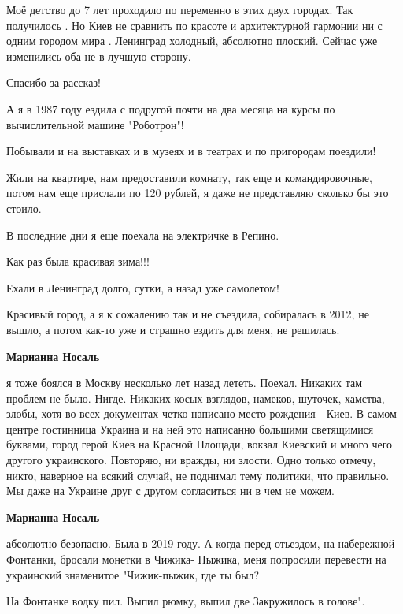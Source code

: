 \begin{itemize}
\begin{itemize}
\end{itemize} %


Моё детство до 7 лет проходило по переменно в этих двух городах. Так получилось .
Но Киев не сравнить по красоте и архитектурной гармонии ни с одним городом мира .
Ленинград холодный, абсолютно плоский.
Сейчас уже изменились оба не в лучшую сторону.

Спасибо за рассказ!

А я в 1987 году ездила с подругой почти на два месяца на курсы по
вычислительной машине "Роботрон"!

Побывали и на выставках и в музеях и в театрах и по пригородам поездили!

Жили на квартире, нам предоставили комнату, так еще и командировочные, потом
нам еще прислали по 120 рублей, я даже не представляю сколько бы это стоило.

В последние дни я еще поехала на электричке в Репино.

Как раз была красивая зима!!!

Ехали в Ленинград долго, сутки, а назад уже самолетом!


Красивый город, а я к сожалению так и не съездила, собиралась в 2012, не вышло,
а потом как-то уже и страшно ездить для меня, не решилась.

\begin{itemize} %
\textbf{Марианна Носаль} 

я тоже боялся в Москву несколько лет назад лететь. Поехал. Никаких там проблем
не было. Нигде. Никаких косых взглядов, намеков, шуточек, хамства, злобы, хотя
во всех документах четко написано место рождения - Киев. В самом центре
гостинница Украина и на ней это написанно большими светящимися буквами, город
герой Киев на Красной Площади, вокзал Киевский и много чего другого
украинского. Повторяю, ни вражды, ни злости. Одно только отмечу, никто,
наверное на всякий случай, не поднимал тему политики, что правильно. Мы даже на
Украине друг с другом согласиться ни в чем не можем.

\textbf{Марианна Носаль} 

абсолютно безопасно. Была в 2019 году. А когда перед отьездом, на набережной
Фонтанки, бросали монетки в Чижика- Пыжика, меня попросили перевести на
украинский знаменитое "Чижик-пыжик, где ты был?

\obeycr
На Фонтанке водку пил.
Выпил рюмку, выпил две
Закружилось в голове".
\restorecr


\end{itemize}
\end{itemize}
